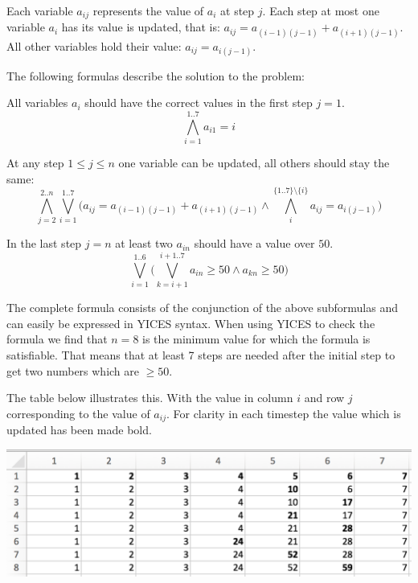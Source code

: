 \documentclass[12pt]{article}
\begin{document}
Each
variable $a_{ij}$ represents the value of $a_i$ at step $j$. Each step at
most one variable $a_i$ has its value is updated, that is: 
$a_{ij} = a_{(i-1)(j-1)}+ a_{(i+1)(j-1)}$. All other variables hold their value:
$a_{ij} = a_{i(j-1)}$.

The following formulas describe the solution to the problem:

\vspace{3mm}

All variables $a_i$ should have the correct values in the first step $j=1$.
\begin{equation}
	\bigwedge_{i=1}^{1..7} a_{i1} = i
\end{equation}

\vspace{3mm}

At any step $1 \le j \leq n$ one variable can be updated, all others should stay
the same:
\begin{equation}
	\bigwedge_{j=2}^{2..n} \bigvee_{i=1}^{1..7} 
		\Big(a_{ij} = a_{(i-1)(j-1)} + a_{(i+1)(j-1)} \wedge
		\bigwedge_i^{\{1..7\}\setminus \{i\}} a_{ij} = a_{i(j-1)} \Big)
\end{equation}

In the last step $j=n$ at least two $a_{in}$ should have a value over $50$. 
\begin{equation}
	\bigvee_{i=1}^{1..6} \Big( \bigvee_{k=i+1}^{i+1..7} 
		a_{in} \geq 50 \wedge a_{kn} \geq 50 \Big)
\end{equation}

The complete formula consists of the conjunction of the above subformulas and
can easily
be expressed in YICES syntax. When using YICES to check the formula
we find that $n=8$ is the minimum value for which the formula is satisfiable.
That means that at least 7 steps are needed after the initial step to get two
numbers which are $\geq 50$.

The table below illustrates this. With the value in
column $i$ and row $j$ corresponding to the value of $a_{ij}$. For clarity in
each timestep the value which is updated has been made bold.

\vspace{3mm}

\includegraphics[width=\textwidth]{four.png}
\end{document}
